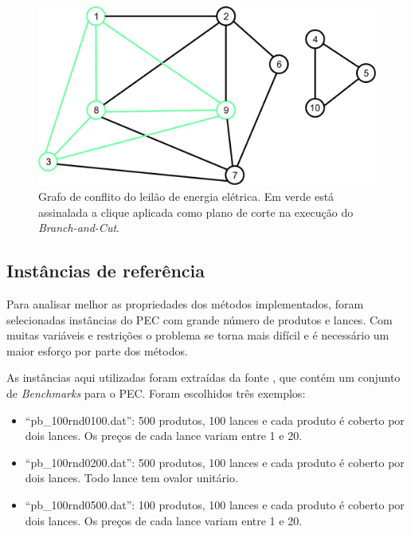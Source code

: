 \documentclass{article}
\begin{document}
    \begin{figure}[H]
        \includegraphics[scale=0.65]{Imagens/GrafoClique.jpg}
             \centering
             \caption{Grafo de conflito do leilão de energia elétrica. Em verde está assinalada a clique aplicada como plano de corte na execução do \emph{Branch-and-Cut}.}
         \label{fig:instance}
    \end{figure} 



    \subsection{Instâncias de referência}
    
    Para analisar melhor as propriedades dos métodos implementados,
    foram selecionadas instâncias do PEC com grande número de produtos e lances. Com muitas variáveis e restrições o problema se torna mais difícil e é necessário um maior esforço por parte dos métodos.
    
    As instâncias aqui utilizadas foram extraídas da fonte \cite{benchmarks}, que contém um conjunto de \emph{Benchmarks} para o PEC. Foram escolhidos três exemplos: 
    \begin{itemize}
        \item \enquote{pb\_100rnd0100.dat}: 500 produtos, 100 lances e cada produto é coberto por dois lances. Os preços de cada lance variam entre 1 e 20.
        \item \enquote{pb\_100rnd0200.dat}: 500 produtos, 100 lances e cada produto é coberto por dois lances. Todo lance tem ovalor unitário.
        \item \enquote{pb\_100rnd0500.dat}: 100 produtos, 100 lances e cada produto é coberto por dois lances. Os preços de cada lance variam entre 1 e 20.
    \end{itemize}
    
\end{document}

